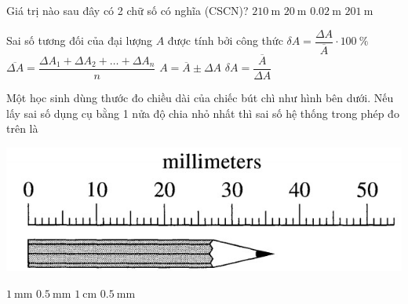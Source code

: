 \begin{ex}
	Giá trị nào sau đây có 2 chữ số có nghĩa (CSCN)?
	\choice
	{\True $\SI{210}{\meter}$}
	{$\SI{20}{\meter}$}
	{$\SI{0.02}{\meter}$}
	{$\SI{201}{\meter}$}
	\loigiai{}
\end{ex}
\begin{ex}
Sai số tương đối của đại lượng $A$ được tính bởi công thức	
	\choice
	{\True $\delta A=\dfrac{\Delta A}{\overline{A}}\cdot\SI{100}{\percent}$}
	{$\overline{\Delta A}=\dfrac{\Delta A_1+\Delta A_2+\dots+\Delta A_n}{n}$}
	{$A=\overline{A}\pm\Delta A$}
	{$\delta A=\dfrac{\overline{A}}{\Delta A}$}
	\loigiai{}
\end{ex}

\begin{ex}
Một học sinh dùng thước đo chiều dài của chiếc bút chì như hình bên dưới. Nếu lấy sai số dụng cụ bằng 1 nửa độ chia nhỏ nhất thì sai số hệ thống trong phép đo trên là	
\begin{center}
	\includegraphics[width=0.4\linewidth]{../figs/G10-CHUONG1-1}
\end{center}
	\choice
	{$\SI{1}{\milli\meter}$}
	{\True $\SI{0.5}{\milli\meter}$}
	{$\SI{1}{\centi\meter}$}
	{$\SI{0.5}{\milli\meter}$}
	\loigiai{}
\end{ex}

